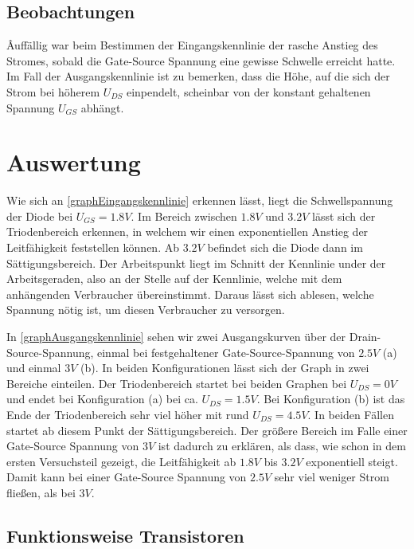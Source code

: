\documentclass[11pt, a4paper]{article}
\begin{document}
\subsection*{Beobachtungen}
Âuffällig war beim Bestimmen der Eingangskennlinie der rasche Anstieg des Stromes, sobald die Gate-Source Spannung eine gewisse Schwelle erreicht hatte.
Im Fall der Ausgangskennlinie ist zu bemerken, dass die Höhe, auf die sich der Strom bei höherem $U_{DS}$ einpendelt, scheinbar von der konstant gehaltenen Spannung $U_{GS}$ abhängt.
\section*{Auswertung}
Wie sich an \autoref{graphEingangskennlinie} erkennen lässt, liegt die Schwellspannung der Diode bei $U_{GS} = 1.8V$. Im Bereich zwischen $1.8V$ und $3.2V$ lässt sich der Triodenbereich erkennen, in welchem wir einen exponentiellen Anstieg der Leitfähigkeit feststellen können. Ab $3.2V$ befindet sich die Diode dann im Sättigungsbereich. Der Arbeitspunkt liegt im Schnitt der Kennlinie under der Arbeitsgeraden, also an der Stelle auf der Kennlinie, welche mit dem anhängenden Verbraucher übereinstimmt. Daraus lässt sich ablesen, welche Spannung nötig ist, um diesen Verbraucher zu versorgen.

In \autoref{graphAusgangskennlinie} sehen wir zwei Ausgangskurven über der Drain-Source-Spannung, einmal bei festgehaltener Gate-Source-Spannung von $2.5V$ (a) und einmal $3V$ (b). In beiden Konfigurationen lässt sich der Graph in zwei Bereiche einteilen. Der Triodenbereich startet bei beiden Graphen bei $U_{DS} = 0 V$ und endet bei Konfiguration (a) bei ca. $U_{DS} = 1.5 V$. Bei Konfiguration (b) ist das Ende der Triodenbereich sehr viel höher mit rund $U_{DS} = 4.5 V$. In beiden Fällen startet ab diesem Punkt der Sättigungsbereich. Der größere Bereich im Falle einer Gate-Source Spannung von $3 V$ ist dadurch zu erklären, als dass, wie schon in dem ersten Versuchsteil gezeigt, die Leitfähigkeit ab $1.8 V$ bis $3.2 V$ exponentiell steigt. Damit kann bei einer Gate-Source Spannung von $2.5 V$ sehr viel weniger Strom fließen, als bei $3 V$.

\subsection*{Funktionsweise Transistoren} %
\label{transistoren_info}
\end{document}
